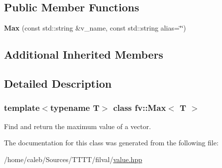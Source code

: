 \subsection*{Public Member Functions}
\begin{DoxyCompactItemize}
\item 
\hypertarget{classfv_1_1Max_a91212548765ddb59ef1150e649a49282}{}\label{classfv_1_1Max_a91212548765ddb59ef1150e649a49282} 
{\bfseries Max} (const std\+::string \&v\+\_\+name, const std\+::string alias=\char`\"{}\char`\"{})
\end{DoxyCompactItemize}
\subsection*{Additional Inherited Members}


\subsection{Detailed Description}
\subsubsection*{template$<$typename T$>$\newline
class fv\+::\+Max$<$ T $>$}

Find and return the maximum value of a vector. 

The documentation for this class was generated from the following file\+:\begin{DoxyCompactItemize}
\item 
/home/caleb/\+Sources/\+T\+T\+T\+T/filval/\hyperlink{value_8hpp}{value.\+hpp}\end{DoxyCompactItemize}
